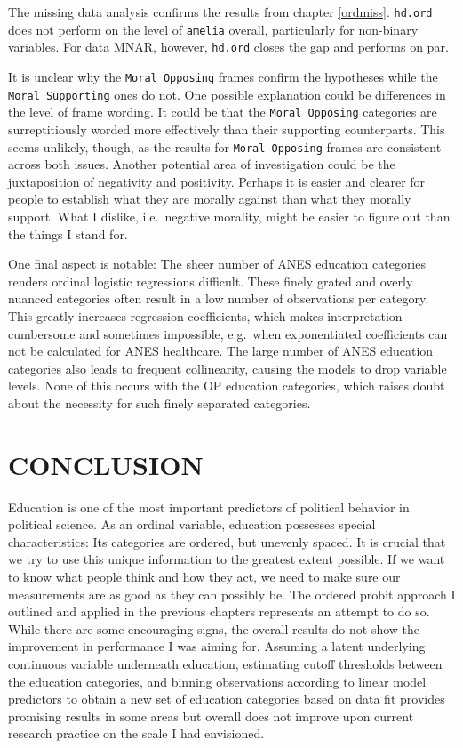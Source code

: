 \documentclass[12pt,econ]{sources/authesis}
\begin{document}
The missing data analysis confirms the results from chapter \ref{ordmiss}. \texttt{hd.ord} does not perform on the level of \texttt{amelia} overall, particularly for non-binary variables. For data MNAR, however, \texttt{hd.ord} closes the gap and performs on par.

It is unclear why the \texttt{Moral\ Opposing} frames confirm the hypotheses while the \texttt{Moral\ Supporting} ones do not. One possible explanation could be differences in the level of frame wording. It could be that the \texttt{Moral\ Opposing} categories are surreptitiously worded more effectively than their supporting counterparts. This seems unlikely, though, as the results for \texttt{Moral\ Opposing} frames are consistent across both issues. Another potential area of investigation could be the juxtaposition of negativity and positivity. Perhaps it is easier and clearer for people to establish what they are morally against than what they morally support. What I dislike, i.e.~negative morality, might be easier to figure out than the things I stand for.

One final aspect is notable: The sheer number of ANES education categories renders ordinal logistic regressions difficult. These finely grated and overly nuanced categories often result in a low number of observations per category. This greatly increases regression coefficients, which makes interpretation cumbersome and sometimes impossible, e.g.~when exponentiated coefficients can not be calculated for ANES healthcare. The large number of ANES education categories also leads to frequent collinearity, causing the models to drop variable levels. None of this occurs with the OP education categories, which raises doubt about the necessity for such finely separated categories.

\hypertarget{conclusion}{%
\chapter{CONCLUSION}\label{conclusion}}

Education is one of the most important predictors of political behavior in political science. As an ordinal variable, education possesses special characteristics: Its categories are ordered, but unevenly spaced. It is crucial that we try to use this unique information to the greatest extent possible. If we want to know what people think and how they act, we need to make sure our measurements are as good as they can possibly be. The ordered probit approach I outlined and applied in the previous chapters represents an attempt to do so. While there are some encouraging signs, the overall results do not show the improvement in performance I was aiming for. Assuming a latent underlying continuous variable underneath education, estimating cutoff thresholds between the education categories, and binning observations according to linear model predictors to obtain a new set of education categories based on data fit provides promising results in some areas but overall does not improve upon current research practice on the scale I had envisioned.
\end{document}
